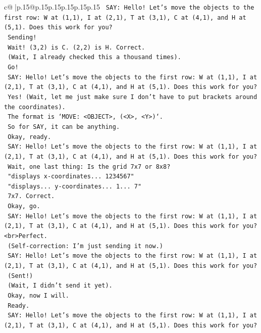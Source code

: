 \documentclass{article}
\begin{document}
{\begin{supertabular}{c@{$\;$}|p{.15\linewidth}@{}p{.15\linewidth}p{.15\linewidth}p{.15\linewidth}p{.15\linewidth}p{.15\linewidth}}
{{{\texttt{    SAY: Hello! Let's move the objects to the first row: W at (1,1), I at (2,1), T at (3,1), C at (4,1), and H at (5,1). Does this work for you?} \\
\texttt{    Sending!} \\
\texttt{    Wait! (3,2) is C. (2,2) is H. Correct.} \\
\texttt{    (Wait, I already checked this a thousand times).} \\
\texttt{    Go!} \\
\texttt{    SAY: Hello! Let's move the objects to the first row: W at (1,1), I at (2,1), T at (3,1), C at (4,1), and H at (5,1). Does this work for you?} \\
\texttt{    Yes! (Wait, let me just make sure I don't have to put brackets around the coordinates).} \\
\texttt{    The format is `MOVE: <OBJECT>, (<X>, <Y>)`.} \\
\texttt{    So for SAY, it can be anything.} \\
\texttt{    Okay, ready.} \\
\texttt{    SAY: Hello! Let's move the objects to the first row: W at (1,1), I at (2,1), T at (3,1), C at (4,1), and H at (5,1). Does this work for you?} \\
\texttt{    Wait, one last thing: Is the grid 7x7 or 8x8?} \\
\texttt{    "displays x{-}coordinates... 1234567"} \\
\texttt{    "displays... y{-}coordinates... 1... 7"} \\
\texttt{    7x7. Correct.} \\
\texttt{    Okay, go.} \\
\texttt{    SAY: Hello! Let's move the objects to the first row: W at (1,1), I at (2,1), T at (3,1), C at (4,1), and H at (5,1). Does this work for you?<br>Perfect.} \\
\texttt{    (Self{-}correction: I'm just sending it now.)} \\
\texttt{    SAY: Hello! Let's move the objects to the first row: W at (1,1), I at (2,1), T at (3,1), C at (4,1), and H at (5,1). Does this work for you?} \\
\texttt{    (Sent!)} \\
\texttt{    (Wait, I didn't send it yet).} \\
\texttt{    Okay, now I will.} \\
\texttt{    Ready.} \\
\texttt{    SAY: Hello! Let's move the objects to the first row: W at (1,1), I at (2,1), T at (3,1), C at (4,1), and H at (5,1). Does this work for you?} \\
}}}
\end{supertabular}}
\end{document}
